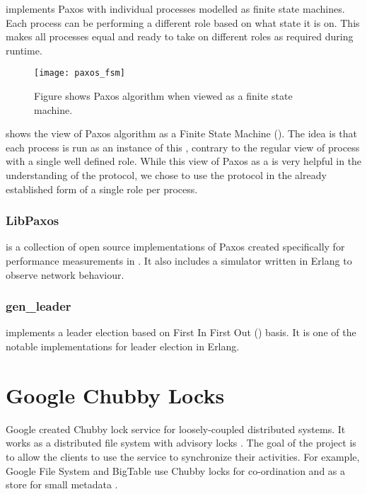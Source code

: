 \citep{Uenishi2012} implements Paxos with
individual processes modelled as finite state machines. Each process can
be performing a different role based on what state it is on. This
makes all processes equal and ready to take on different roles
as required during runtime.

\begin{figure}
  \begin{whole}
  \texttt{[image: paxos\_fsm]}
  \caption[Paxos ]{%
    Figure shows Paxos algorithm when viewed as a finite state machine.}
  \label{figure:paxos.fsm}
  \end{whole}
\end{figure}

 shows the view of Paxos algorithm as a Finite State
Machine (). The idea is that each process is run as an instance of
this , contrary to the regular view of process with a single well
defined role. While this view of Paxos as a  is very helpful in the
understanding of the protocol, we chose to use the protocol in the already
established form of a single role per process.

\subsubsection{LibPaxos}

\citet{Lugano2012} is a collection of open source
implementations of Paxos created specifically for performance measurements
in \citet{MarandiPSP10}. It also includes a simulator written in Erlang to
observe network behaviour.

\subsubsection{gen\_leader}

\citet{Ulf2012} implements a leader election based on First In
First Out () basis. It is one of the notable implementations for
leader election in Erlang.

\section{Google Chubby Locks}
\label{section:chubby.locks}

Google created Chubby lock service \citep{Burrows06} for loosely-coupled
distributed systems. It works as a distributed file system with advisory
locks%
. The goal of the project is to allow the clients to use the service
to synchronize their activities. For example, Google File System \citep{gfs}
and BigTable \citep{ChangDGHWBCFG06} use Chubby locks for co-ordination and
as a store for small metadata \citep{ChandraGR07}.

